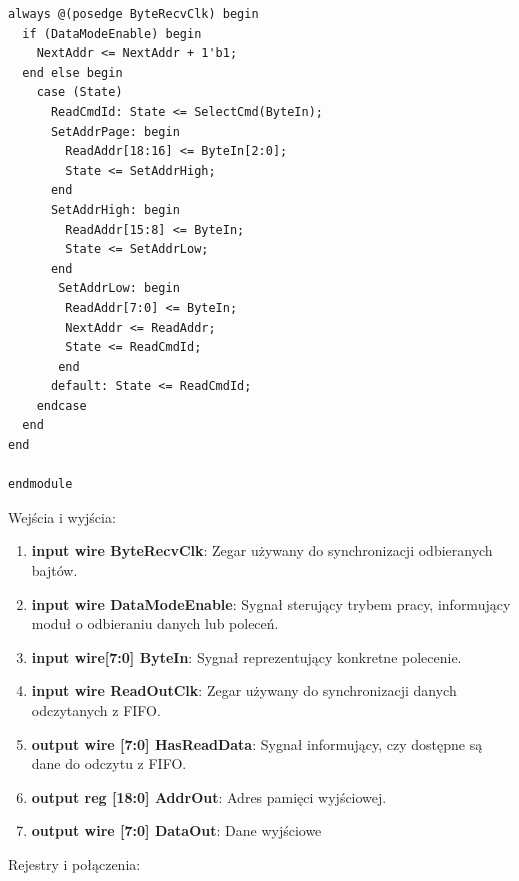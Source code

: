 \documentclass[12pt, a4paper]{article}
\begin{document}
\begin{lstlisting}[style=prettyverilog,caption={Moduł vcmd.v}]
always @(posedge ByteRecvClk) begin
  if (DataModeEnable) begin
    NextAddr <= NextAddr + 1'b1;
  end else begin
    case (State)
      ReadCmdId: State <= SelectCmd(ByteIn);
      SetAddrPage: begin
        ReadAddr[18:16] <= ByteIn[2:0];
        State <= SetAddrHigh;
      end
      SetAddrHigh: begin
        ReadAddr[15:8] <= ByteIn;
        State <= SetAddrLow;
      end
	   SetAddrLow: begin
        ReadAddr[7:0] <= ByteIn;
        NextAddr <= ReadAddr;		  
        State <= ReadCmdId;
	   end
      default: State <= ReadCmdId;
    endcase
  end
end

endmodule
\end{lstlisting}
Wejścia i wyjścia:
\begin{enumerate}
     \item \textbf{\fontsize{11}{10}\selectfont input wire ByteRecvClk}: Zegar używany do synchronizacji odbieranych bajtów.
    \item \textbf{\fontsize{11}{10}\selectfont input wire DataModeEnable}:  Sygnał sterujący trybem pracy, informujący moduł o odbieraniu danych lub poleceń.
    \item \textbf{\fontsize{11}{10}\selectfont input wire[7:0] ByteIn}: Sygnał reprezentujący konkretne polecenie.
    \item \textbf{\fontsize{11}{10}\selectfont input wire ReadOutClk}: Zegar używany do synchronizacji danych odczytanych z FIFO.
     \item \textbf{\fontsize{11}{10}\selectfont output wire [7:0] HasReadData}: Sygnał informujący, czy dostępne są dane do odczytu z FIFO.
     \item \textbf{\fontsize{11}{10}\selectfont output reg [18:0] AddrOut}: Adres pamięci wyjściowej.
     \item \textbf{\fontsize{11}{10}\selectfont output wire [7:0] DataOut}: Dane wyjściowe
\end{enumerate}
Rejestry i połączenia:
\end{document}
